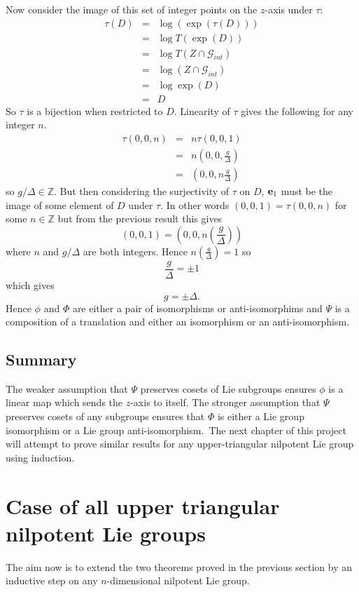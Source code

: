 \documentclass[honours]{UNSWthesis}
\newcommand{\Z}{\mathbb{Z}}
\newcommand{\G}{\mathcal{G}}
\newcommand{\1}{\mathbf{e}_{1}}
\newcommand{\2}{\mathbf{e}_{3}}
\newcommand{\3}{\mathbf{e}_{3}}
\begin{document}
Now consider the image of this set of integer points on the $z$-axis under $\tau$:
\begin{eqnarray*}
\tau(D)&=& \log(\exp (\tau(D))) \\
&=& \log T(\exp (D)) \\
&=& \log T(Z \cap \G_{int}) \\
&=& \log (Z \cap \G_{int}) \\
&=& \log \exp (D) \\
&=& D
\end{eqnarray*}
So $\tau$ is a bijection when restricted to $D$. Linearity of $\tau$ gives the following for any integer $n$.
\begin{eqnarray*}
\tau (0,0,n) &=& n \tau (0,0,1) \\
&=& n\left(0,0, \frac{g}{\Delta}\right) \\
&=& \left(0,0, n \frac{g}{\Delta}\right)
\end{eqnarray*}
so $g/\Delta \in \Z$. But then considering the surjectivity of $\tau$ on $D$, ${\bf e}_{1}$ must be the image of some element of $D$ under $\tau$. In other words $(0,0,1)=\tau(0,0,n)$ for some $n \in \Z$ but from the previous result this gives 
\[
(0,0,1)=\left(0,0, n\left(\frac{g}{\Delta}\right)\right)
\]
where $n$ and $g/\Delta$ are both integers. Hence $n \left( \frac{g}{\Delta}\right)=1$ so 
\[
\frac{g}{\Delta}= \pm 1
\]
which gives
\[
g=\pm \Delta.
\]
Hence $\phi$ and $\Phi$ are either a pair of isomorphisms or anti-isomorphims and $\Psi$ is a composition of a translation and either an isomorphism or an anti-isomorphism.

\section{Summary}
The weaker assumption that $\Psi$ preserves cosets of Lie subgroups ensures $\phi$ is a linear map which sends the $z$-axis to itself. The stronger assumption that $\Psi$ preserves cosets of any subgroups ensures that $\Phi$ is either a Lie group isomorphism or a Lie group anti-isomorphism.\
The next chapter of this project will attempt to prove similar results for any upper-triangular nilpotent Lie group using induction. 

\chapter{Case of all upper triangular nilpotent Lie groups}
The aim now is to extend the two theorems proved in the previous section by an inductive step on any $n$-dimensional nilpotent Lie group.
\end{document}
